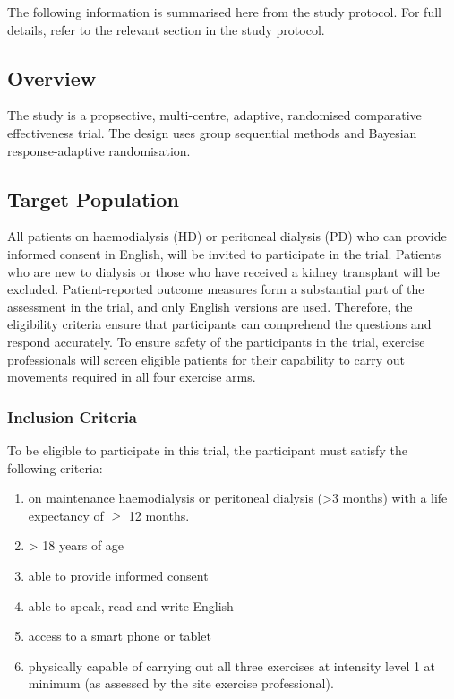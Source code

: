 \documentclass[
]{article}
\providecommand{\tightlist}{%
  \setlength{\itemsep}{0pt}\setlength{\parskip}{0pt}}
\begin{document}
The following information is summarised here from the study protocol.
For full details, refer to the relevant section in the study protocol.

\hypertarget{overview}{
  \subsection{Overview}\label{overview}}

The study is a propsective, multi-centre, adaptive, randomised comparative effectiveness trial.
The design uses group sequential methods and Bayesian response-adaptive randomisation.


\hypertarget{target-population}{%
  \subsection{Target Population}\label{target-population}}

All patients on haemodialysis (HD) or peritoneal dialysis (PD) who can provide informed consent in English, will be invited to participate in the trial.
Patients who are new to dialysis or those who have received a kidney transplant will be excluded.
Patient-reported outcome measures form a substantial part of the assessment in the trial, and only English versions are used.
Therefore, the eligibility criteria ensure that participants can comprehend the questions and respond accurately.
To ensure safety of the participants in the trial, exercise professionals will screen eligible patients for their capability to carry out movements required in all four exercise arms.

\hypertarget{inclusion-criteria}{
  \subsubsection{Inclusion Criteria}\label{inclusion-criteria}
}

To be eligible to participate in this trial, the participant must satisfy the following criteria:

\begin{enumerate}
  \def\labelenumi{\arabic{enumi}.}
  \tightlist
  \item on maintenance haemodialysis or peritoneal dialysis (>3 months) with a life expectancy of $\ge$ 12 months.
  \item > 18 years of age
  \item able to provide informed consent
  \item able to speak, read and write English
  \item access to a smart phone or tablet
  \item physically capable of carrying out all three exercises at intensity level 1 at minimum (as assessed by the site exercise professional).
\end{enumerate}
\end{document}
